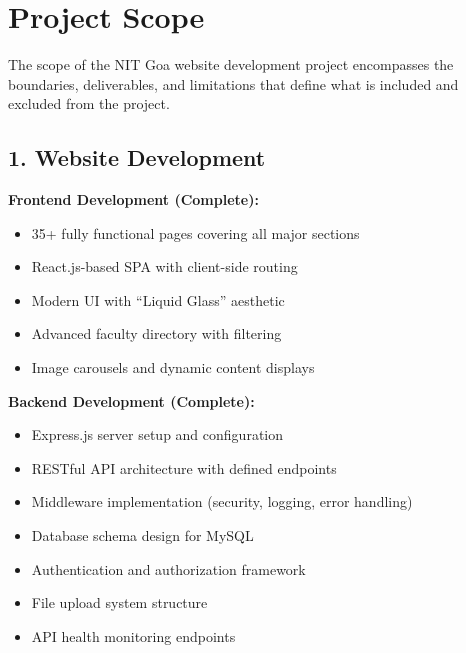 \documentclass[12pt,a4paper]{report}
\begin{document}
\section{Project Scope}

The scope of the NIT Goa website development project encompasses the boundaries, deliverables, and limitations that define what is included and excluded from the project.

\subsection*{1. Website Development}
\textbf{Frontend Development (Complete):}
\begin{itemize}
    \item 35+ fully functional pages covering all major sections
    \item React.js-based SPA with client-side routing
    \item Modern UI with ``Liquid Glass'' aesthetic
    \item Advanced faculty directory with filtering
    \item Image carousels and dynamic content displays
\end{itemize}

\item\textbf{Backend Development (Complete):}
\begin{itemize}
    \item Express.js server setup and configuration
    \item RESTful API architecture with defined endpoints
    \item Middleware implementation (security, logging, error handling)
    \item Database schema design for MySQL
    \item Authentication and authorization framework
    \item File upload system structure
    \item API health monitoring endpoints
\end{itemize}
\end{document}
